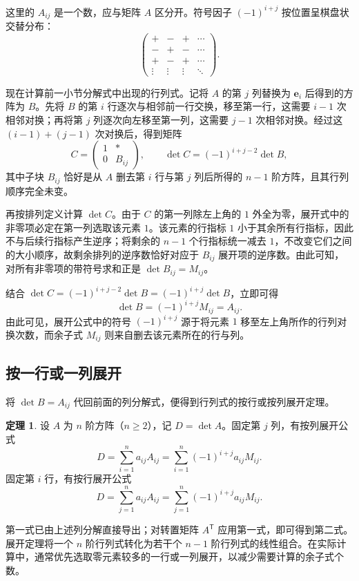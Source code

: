 \documentclass[UTF8, fontset=fandol, a4paper, 12pt]{ctexart}
\theoremstyle{definition}
\newtheorem{theorem}{定理}[section]
\begin{document}
这里的 $A_{ij}$ 是一个数，应与矩阵 $A$ 区分开。符号因子 $(-1)^{i+j}$ 按位置呈棋盘状交替分布：
\[
 \begin{pmatrix}+&-&+&\cdots\\-&+&-&\cdots\\+&-&+&\cdots\\\vdots&\vdots&\vdots&\ddots\end{pmatrix}.
\]

现在计算前一小节分解式中出现的行列式。记将 $A$ 的第 $j$ 列替换为 $\boldsymbol e_i$ 后得到的方阵为 $B$。先将 $B$ 的第 $i$ 行逐次与相邻前一行交换，移至第一行，这需要 $i-1$ 次相邻对换；再将第 $j$ 列逐次向左移至第一列，这需要 $j-1$ 次相邻对换。经过这 $(i-1)+(j-1)$ 次对换后，得到矩阵
\[
 C=\begin{pmatrix}1&*\\0&B_{ij}\end{pmatrix},
 \qquad \det C=(-1)^{i+j-2}\det B,
\]
其中子块 $B_{ij}$ 恰好是从 $A$ 删去第 $i$ 行与第 $j$ 列后所得的 $n-1$ 阶方阵，且其行列顺序完全未变。

再按排列定义计算 $\det C$。由于 $C$ 的第一列除左上角的 $1$ 外全为零，展开式中的非零项必定在第一列选取该元素 $1$。该元素的行指标 $1$ 小于其余所有行指标，因此不与后续行指标产生逆序；将剩余的 $n-1$ 个行指标统一减去 $1$，不改变它们之间的大小顺序，故剩余排列的逆序数恰好对应于 $B_{ij}$ 展开项的逆序数。由此可知，对所有非零项的带符号求和正是 $\det B_{ij}=M_{ij}$。

结合 $\det C=(-1)^{i+j-2}\det B=(-1)^{i+j}\det B$，立即可得
\[
 \det B=(-1)^{i+j}M_{ij}=A_{ij}.
\]
由此可见，展开公式中的符号 $(-1)^{i+j}$ 源于将元素 $1$ 移至左上角所作的行列对换次数，而余子式 $M_{ij}$ 则来自删去该元素所在的行与列。

\subsection{按一行或一列展开}

将 $\det B=A_{ij}$ 代回前面的列分解式，便得到行列式的按行或按列展开定理。

\begin{theorem}
设 $A$ 为 $n$ 阶方阵（$n\ge2$），记 $D=\det A$。固定第 $j$ 列，有按列展开公式
\[
 \boxed{D=\sum_{i=1}^n a_{ij}A_{ij}
           =\sum_{i=1}^n(-1)^{i+j}a_{ij}M_{ij}.}
\]
固定第 $i$ 行，有按行展开公式
\[
 \boxed{D=\sum_{j=1}^n a_{ij}A_{ij}
           =\sum_{j=1}^n(-1)^{i+j}a_{ij}M_{ij}.}
\]
\end{theorem}

第一式已由上述列分解直接导出；对转置矩阵 $A^{\mathsf T}$ 应用第一式，即可得到第二式。展开定理将一个 $n$ 阶行列式转化为若干个 $n-1$ 阶行列式的线性组合。在实际计算中，通常优先选取零元素较多的一行或一列展开，以减少需要计算的余子式个数。
\end{document}
